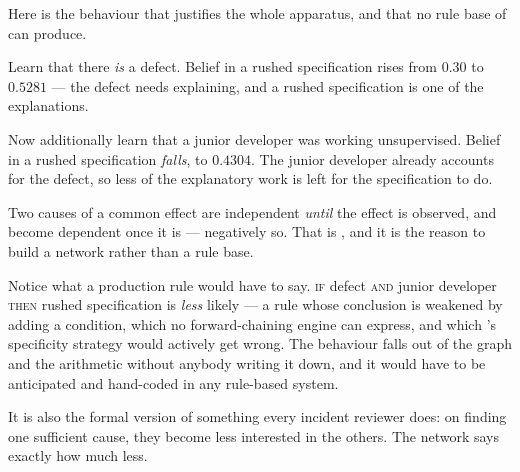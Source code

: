Here is the behaviour that justifies the whole apparatus, and that no rule base of
 can produce.

Learn that there \emph{is} a defect. Belief in a rushed specification rises from
$0.30$ to $0.5281$ --- the defect needs explaining, and a rushed specification is
one of the explanations.

Now additionally learn that a junior developer was working unsupervised. Belief in a
rushed specification \emph{falls}, to $0.4304$. The junior developer already
accounts for the defect, so less of the explanatory work is left for the
specification to do.

\begin{conceptbox}
Two causes of a common effect are independent \emph{until} the effect is observed,
and become dependent once it is --- negatively so. That is ,
and it is the reason to build a network rather than a rule base.

Notice what a production rule would have to say. \textsc{if} defect \textsc{and}
junior developer \textsc{then} rushed specification is \emph{less} likely --- a rule
whose conclusion is weakened by adding a condition, which no forward-chaining engine
can express, and which 's specificity strategy would actively get
wrong. The behaviour falls out of the graph and the arithmetic without anybody
writing it down, and it would have to be anticipated and hand-coded in any
rule-based system.

It is also the formal version of something every incident reviewer does: on finding
one sufficient cause, they become less interested in the others. The network says
exactly how much less.
\end{conceptbox}

